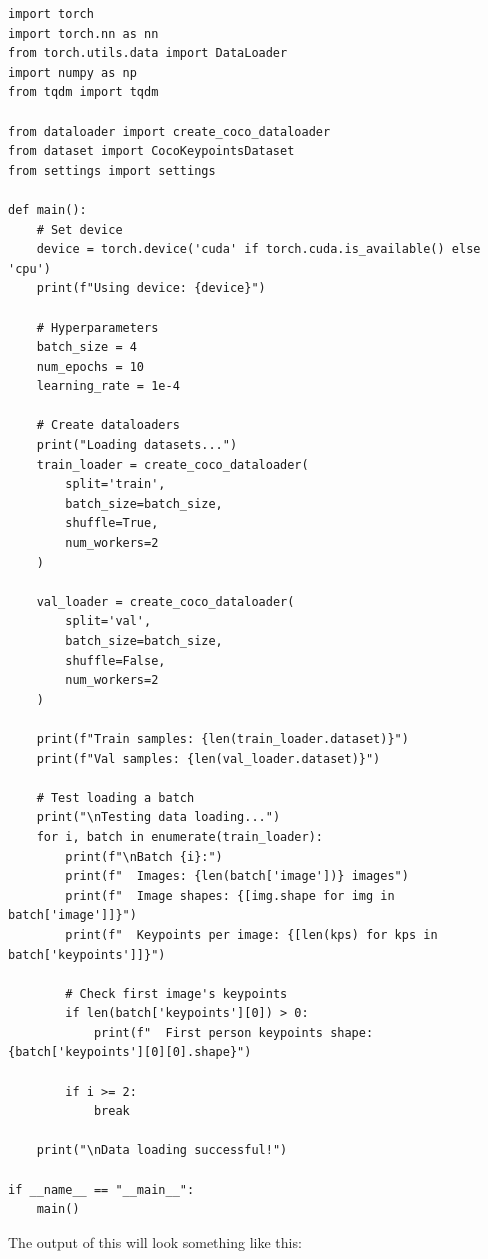 \begin{lstlisting}[style=pythonstyle,title={Main file basic setup May},label={code:basic}]
import torch
import torch.nn as nn
from torch.utils.data import DataLoader
import numpy as np
from tqdm import tqdm

from dataloader import create_coco_dataloader
from dataset import CocoKeypointsDataset
from settings import settings

def main():
    # Set device
    device = torch.device('cuda' if torch.cuda.is_available() else 'cpu')
    print(f"Using device: {device}")
    
    # Hyperparameters
    batch_size = 4
    num_epochs = 10
    learning_rate = 1e-4
    
    # Create dataloaders
    print("Loading datasets...")
    train_loader = create_coco_dataloader(
        split='train',
        batch_size=batch_size,
        shuffle=True,
        num_workers=2
    )
    
    val_loader = create_coco_dataloader(
        split='val',
        batch_size=batch_size,
        shuffle=False,
        num_workers=2
    )
    
    print(f"Train samples: {len(train_loader.dataset)}")
    print(f"Val samples: {len(val_loader.dataset)}")
    
    # Test loading a batch
    print("\nTesting data loading...")
    for i, batch in enumerate(train_loader):
        print(f"\nBatch {i}:")
        print(f"  Images: {len(batch['image'])} images")
        print(f"  Image shapes: {[img.shape for img in batch['image']]}")
        print(f"  Keypoints per image: {[len(kps) for kps in batch['keypoints']]}")
        
        # Check first image's keypoints
        if len(batch['keypoints'][0]) > 0:
            print(f"  First person keypoints shape: {batch['keypoints'][0][0].shape}")
        
        if i >= 2:
            break
    
    print("\nData loading successful!")

if __name__ == "__main__":
    main()
\end{lstlisting}

The output of this will look something like this:

